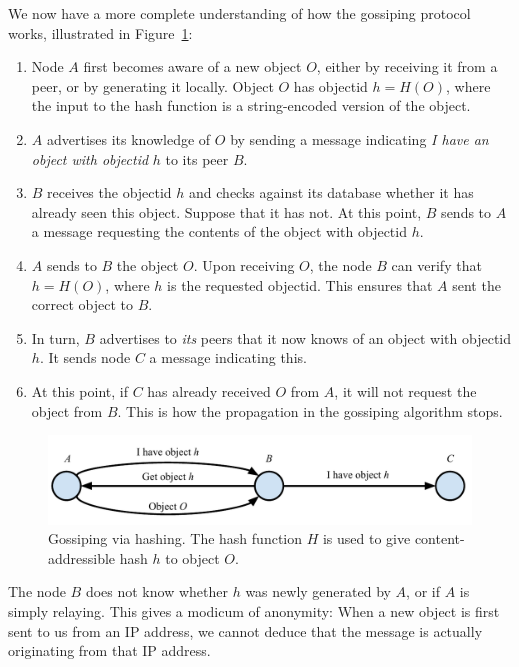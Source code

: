 We now have a more complete understanding of how the gossiping protocol works,
illustrated in Figure~\ref{fig:gossiping-via-hashing}:

\begin{enumerate}
  \item Node $A$ first becomes aware of a new object $O$, either by receiving it from a peer,
        or by generating it locally. Object $O$ has objectid $h = H(O)$, where the input to the
        hash function is a string-encoded version of the object.
  \item $A$ advertises its knowledge of $O$ by sending a message
        indicating \emph{I have an object with objectid} $h$ to its peer $B$.
  \item $B$ receives the objectid $h$ and checks against its database whether it has already seen
        this object. Suppose that it has not. At this point, $B$ sends to $A$ a message
        requesting the contents of the object with objectid $h$.
  \item $A$ sends to $B$ the object $O$. Upon receiving $O$, the node $B$ can verify that
        $h = H(O)$, where $h$ is the requested objectid. This ensures that $A$ sent the
        correct object to $B$.
  \item In turn, $B$ advertises to \emph{its} peers that it now knows of an object with
        objectid $h$. It sends node $C$ a message indicating this.
  \item At this point, if $C$ has already received $O$ from $A$, it will not request
        the object from $B$. This is how the propagation in the gossiping algorithm stops.
\end{enumerate}

\begin{figure}
    \centering
    \includegraphics[width=\columnwidth,keepaspectratio]{figures/gossiping-via-hashing.pdf}
    \caption{Gossiping via hashing. The hash function $H$ is used to give content-addressible hash $h$ to object $O$.}
    \label{fig:gossiping-via-hashing}
\end{figure}

The node $B$ does not know whether $h$ was newly generated by $A$, or if $A$ is simply relaying.
This gives a modicum of anonymity: When a new object is first sent to us from an IP address,
we cannot deduce that the message is actually originating from that IP address.

